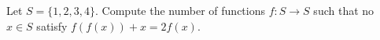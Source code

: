 Let $S=\{1,2,3,4\}$. Compute the number of functions $f:S\rightarrow S$ such that no $x\in S$ satisfy $f(f(x))+x=2f(x)$.

